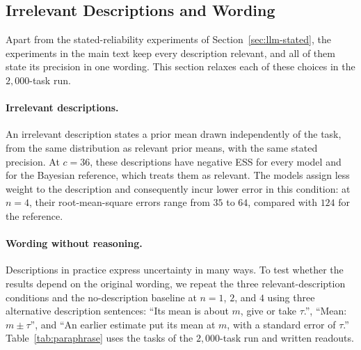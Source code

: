 \documentclass{article}
\theoremstyle{definition}
\begin{document}
\begin{table}[t]
\centering\small
\setlength{\tabcolsep}{4pt}
\caption{\textbf{Sensitivity of median ESS to baseline-curve estimation.} Median ESS over $n = 1$, $2$, and $4$ for relevant descriptions, using the $2{,}000$-task run without reasoning at $\sigma = 60$. ``Log $n$'' is the primary estimator; ``linear'' interpolates in $n$; ``monotone'' applies a non-increasing fit; and ``fit'' uses $A/(n+n_0)+B$. The reference's idealized ESS values are $1$, $4$, and $36$.}
\label{tab:sensitivity}
\vspace{3pt}

\end{table}

\subsection{Irrelevant Descriptions and Wording}\label{app:wording}

Apart from the stated-reliability experiments of Section~\ref{sec:llm-stated}, the experiments in the main text keep every description relevant, and all of them state its precision in one wording. This section relaxes each of these choices in the $2{,}000$-task run.

\paragraph{Irrelevant descriptions.}
An irrelevant description states a prior mean drawn independently of the task, from the same distribution as relevant prior means, with the same stated precision. At $c = 36$, these descriptions have negative ESS for every model and for the Bayesian reference, which treats them as relevant. The models assign less weight to the description and consequently incur lower error in this condition: at $n = 4$, their root-mean-square errors range from $35$ to $64$, compared with $124$ for the reference.

\paragraph{Wording without reasoning.}
Descriptions in practice express uncertainty in many ways. To test whether the results depend on the original wording, we repeat the three relevant-description conditions and the no-description baseline at $n = 1$, $2$, and $4$ using three alternative description sentences: ``Its mean is about $m$, give or take $\tau$.'', ``Mean: $m \pm \tau$'', and ``An earlier estimate put its mean at $m$, with a standard error of $\tau$.'' Table~\ref{tab:paraphrase} uses the tasks of the $2{,}000$-task run and written readouts.
\end{document}
